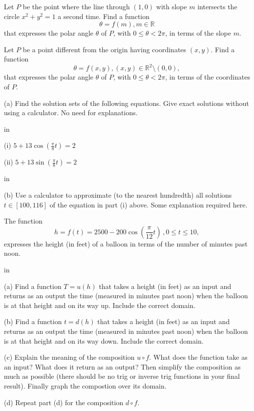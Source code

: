 \documentclass{ximera}
\newcommand{\pskip}{\vskip 0.1 in}
\begin{document}
\begin{question} \label{Q19:InverseTrig}
Let $P$ be the point where the line through $(1,0)$ with slope $m$ intersects the circle $x^2+y^2=1$ a second time. Find a function 
\[
      \theta = f(m) , m \in \mathbb{R}
\] 
that expresses the polar angle $\theta$ of $P$, with $0 \leq  \theta < 2\pi$, in terms of the slope $m$. 
\end{question}

\begin{question} \label{Q20:InverseTrig}
Let $P$ be a point different from the origin having coordinates $(x,y)$. Find a function 
\[
      \theta = f(x,y) , (x,y) \in \mathbb{R}^2 \setminus {(0,0)} ,
\] 
that expresses the polar angle $\theta$ of $P$, with $0 \leq  \theta < 2\pi$, in terms of the coordinates of $P$.

\end{question}

\begin{question} \label{Q23:InverseTrig}
(a) Find the solution sets of the following equations. Give exact solutions without using a calculator. No need for explanations.

\pskip

(i) $5 + 13 \cos \left( \frac{\pi}{8}t \right) = 2$

(ii) $5 + 13 \sin \left( \frac{\pi}{8}t \right) = 2$

\pskip

(b) Use a calculator to approximate (to the nearest hundredth) all solutions $t\in [100, 116]$ of the equation in part (i) above. Some explanation required here.

\end{question}


\begin{question} \label{Q25:InverseTrig}
The function
\[
  h = f(t) = 2500 - 200 \cos \left(  \frac{\pi}{12}t  \right) \, , 0\leq t \leq 10 ,
\]
expresses the height (in feet) of a balloon in terms of the number of minutes past noon.

\pskip

(a) Find a function $T=u(h)$ that takes a height (in feet) as an input and returns as an output the time (measured in minutes past noon) when the balloon is at that height and on its way up. Include the correct domain.

(b) Find a function $t=d(h)$ that  takes a height (in feet) as an input and returns as an output the time (measured in minutes past noon) when the balloon is at that height and on its way down. Include the correct domain.

(c) Explain the meaning of the composition $u\circ f$. What does the function take as an input? What does it return as an output? Then simplify the composition as much as possible (there should be no trig or inverse trig functions in your final result). Finally graph the compostion over its domain.

(d) Repeat part (d) for the composition $d\circ f$.

\end{question}
\end{document}
